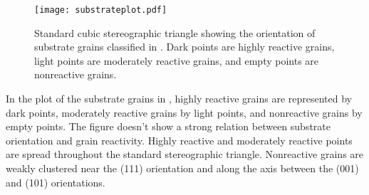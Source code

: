 \begin{figure}
	\begin{center}
	\texttt{[image: substrateplot.pdf]}
	\caption[Orientation of substrate grains]{%
	Standard cubic stereographic triangle showing the orientation of
	substrate grains classified in . Dark points are
	highly reactive grains, light points are moderately reactive grains,
	and empty points are nonreactive grains.}
	\label{fig:substrateplot}
	\end{center}
\end{figure}
In the plot of the substrate grains in , highly reactive grains
are represented by dark points, moderately reactive grains by light points, and
nonreactive grains by empty points. The figure doesn't show a strong relation between
substrate orientation and grain reactivity. Highly reactive and moderately reactive points
are spread throughout the standard stereographic triangle. Nonreactive grains are weakly
clustered near the (111) orientation and along the axis between the (001) and (101)
orientations.

